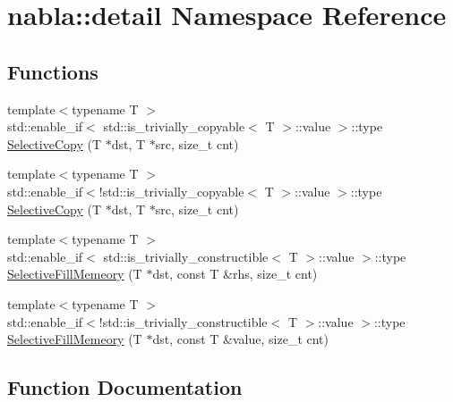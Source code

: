 \hypertarget{namespacenabla_1_1detail}{}\section{nabla\+::detail Namespace Reference}
\label{namespacenabla_1_1detail}
\subsection*{Functions}
\begin{DoxyCompactItemize}
\item 
{\footnotesize template$<$typename T $>$ }\\std\+::enable\+\_\+if$<$ std\+::is\+\_\+trivially\+\_\+copyable$<$ T $>$\+::value $>$\+::type \mbox{\hyperlink{namespacenabla_1_1detail_a4449954592d3766d202e6a2b503f3c53}{Selective\+Copy}} (T $\ast$dst, T $\ast$src, size\+\_\+t cnt)
\item 
{\footnotesize template$<$typename T $>$ }\\std\+::enable\+\_\+if$<$!std\+::is\+\_\+trivially\+\_\+copyable$<$ T $>$\+::value $>$\+::type \mbox{\hyperlink{namespacenabla_1_1detail_a49314cb932a8a0cdb9a6f78defa31dc9}{Selective\+Copy}} (T $\ast$dst, T $\ast$src, size\+\_\+t cnt)
\item 
{\footnotesize template$<$typename T $>$ }\\std\+::enable\+\_\+if$<$ std\+::is\+\_\+trivially\+\_\+constructible$<$ T $>$\+::value $>$\+::type \mbox{\hyperlink{namespacenabla_1_1detail_aed72e71163857bccfe1c395dfdde5e95}{Selective\+Fill\+Memeory}} (T $\ast$dst, const T \&rhs, size\+\_\+t cnt)
\item 
{\footnotesize template$<$typename T $>$ }\\std\+::enable\+\_\+if$<$!std\+::is\+\_\+trivially\+\_\+constructible$<$ T $>$\+::value $>$\+::type \mbox{\hyperlink{namespacenabla_1_1detail_afe42a62d9b26104bee1800ccf1ec2191}{Selective\+Fill\+Memeory}} (T $\ast$dst, const T \&value, size\+\_\+t cnt)
\end{DoxyCompactItemize}


\subsection{Function Documentation}
\mbox{\label{namespacenabla_1_1detail_a4449954592d3766d202e6a2b503f3c53}} 
